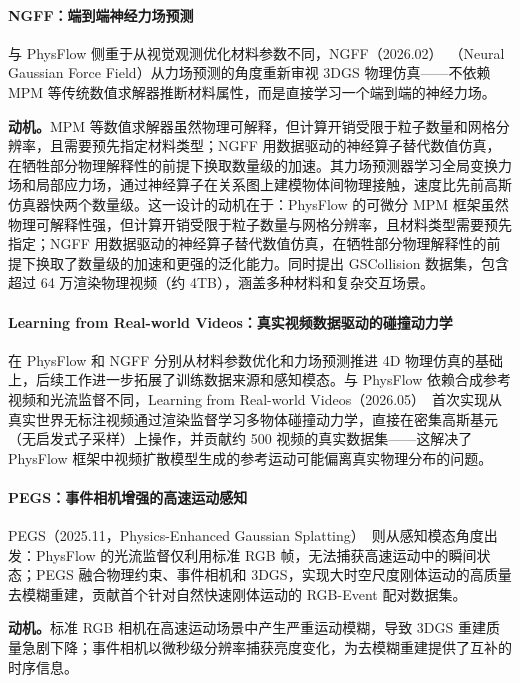 \paragraph{NGFF：端到端神经力场预测}

与 PhysFlow 侧重于从视觉观测优化材料参数不同，NGFF（2026.02）~\cite{2602_00148}（Neural Gaussian Force Field）从力场预测的角度重新审视 3DGS 物理仿真——不依赖 MPM 等传统数值求解器推断材料属性，而是直接学习一个端到端的神经力场。

\textbf{动机。}MPM 等数值求解器虽然物理可解释，但计算开销受限于粒子数量和网格分辨率，且需要预先指定材料类型；NGFF 用数据驱动的神经算子替代数值仿真，在牺牲部分物理解释性的前提下换取数量级的加速。其力场预测器学习全局变换力场和局部应力场，通过神经算子在关系图上建模物体间物理接触，速度比先前高斯仿真器快两个数量级。这一设计的动机在于：PhysFlow 的可微分 MPM 框架虽然物理可解释性强，但计算开销受限于粒子数量与网格分辨率，且材料类型需要预先指定；NGFF 用数据驱动的神经算子替代数值仿真，在牺牲部分物理解释性的前提下换取了数量级的加速和更强的泛化能力。同时提出 GSCollision 数据集，包含超过 64 万渲染物理视频（约 4TB），涵盖多种材料和复杂交互场景。

\paragraph{Learning from Real-world Videos：真实视频数据驱动的碰撞动力学}

在 PhysFlow 和 NGFF 分别从材料参数优化和力场预测推进 4D 物理仿真的基础上，后续工作进一步拓展了训练数据来源和感知模态。与 PhysFlow 依赖合成参考视频和光流监督不同，Learning from Real-world Videos（2026.05）~\cite{2605_23845}首次实现从真实世界无标注视频通过渲染监督学习多物体碰撞动力学，直接在密集高斯基元（无启发式子采样）上操作，并贡献约 500 视频的真实数据集——这解决了 PhysFlow 框架中视频扩散模型生成的参考运动可能偏离真实物理分布的问题。

\paragraph{PEGS：事件相机增强的高速运动感知}

PEGS（2025.11，Physics-Enhanced Gaussian Splatting）~\cite{2511_17116}则从感知模态角度出发：PhysFlow 的光流监督仅利用标准 RGB 帧，无法捕获高速运动中的瞬间状态；PEGS 融合物理约束、事件相机和 3DGS，实现大时空尺度刚体运动的高质量去模糊重建，贡献首个针对自然快速刚体运动的 RGB-Event 配对数据集。

\textbf{动机。}标准 RGB 相机在高速运动场景中产生严重运动模糊，导致 3DGS 重建质量急剧下降；事件相机以微秒级分辨率捕获亮度变化，为去模糊重建提供了互补的时序信息。


